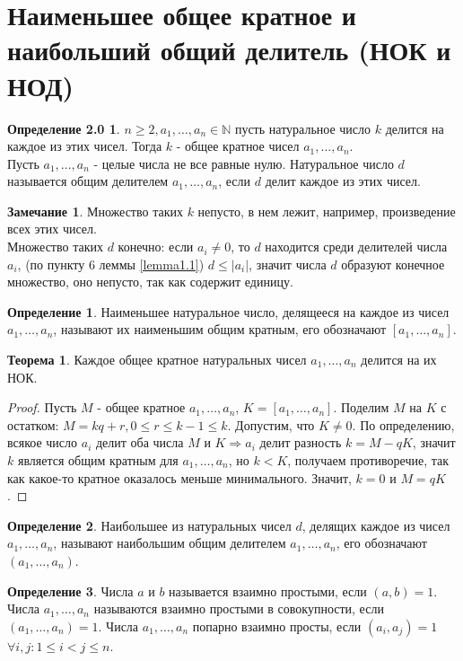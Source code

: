 \documentclass[a4paper, 12pt]{article}
\theoremstyle{definition}
\newtheorem{definition}{Определение}[section]
\newtheorem{theorem}{Теорема}[section]
\newtheorem*{comm}{Замечание}
\newtheorem*{def20}{Определение 2.0}
\begin{document}
    \section{Наименьшее общее кратное и наибольший общий делитель (НОК и НОД)}
    \begin{def20}
         $n\geq 2, a_1, \dots, a_n \in \mathbb{N}$ пусть натуральное число $k$ делится на каждое из этих чисел. Тогда $k$ - общее кратное чисел $a_1, \dots, a_n$. \\
        Пусть $a_1, \dots, a_n$ - целые числа не все равные нулю. Натуральное число $d$ называется общим делителем $a_1, \dots, a_n$, если $d$ делит каждое из этих чисел.
    \end{def20}
    \begin{comm}
        Множество таких $k$ непусто, в нем лежит, например, произведение всех этих чисел. \\ Множество таких $d$ конечно: если $a_i\ne 0$, то $d$ находится среди делителей числа $a_i$, (по пункту 6 леммы \ref{lemma1.1}) $d\leq |a_i|$, значит числа $d$ образуют конечное множество, оно непусто, так как содержит единицу.
    \end{comm}
    \begin{definition}
        Наименьшее натуральное число, делящееся на каждое из чисел $a_1, \dots, a_n$, называют их наименьшим общим кратным, его обозначают $[a_1, \dots, a_n]$.
    \end{definition}
    \begin{theorem} \label{th2.1}
        Каждое общее кратное натуральных чисел $a_1, \dots, a_n$ делится на их НОК.
    \end{theorem}
    \begin{proof}
        Пусть $M$ - общее кратное $a_1, \dots, a_n$, $K=[a_1, \dots, a_n]$. Поделим $M$ на $K$ с остатком: $M=kq+r, 0\leq r\leq k-1\leq k$. Допустим, что $K\ne 0$. По определению, всякое число $a_i$ делит оба числа $M$ и $K \Rightarrow a_i$ делит разность $k=M-qK$, значит $k$ является общим кратным для $a_1, \dots, a_n$, но $k<K$, получаем противоречие, так как какое-то кратное оказалось меньше минимального. Значит, $k=0$ и $M=qK$.  
    \end{proof}
    \begin{definition}
        Наибольшее из натуральных чисел $d$, делящих каждое из чисел $a_1, \dots, a_n$, называют наибольшим общим делителем $a_1, \dots, a_n$, его обозначают $(a_1, \dots, a_n)$.
    \end{definition}
    \begin{definition}
        Числа $a$ и $b$ называется взаимно простыми, если $(a,b)=1$. Числа $a_1, \dots, a_n$ называются взаимно простыми в совокупности, если \\ $(a_1, \dots, a_n)=1$. Числа $a_1, \dots, a_n$ попарно взаимно просты, если $(a_i,a_j)=1$ $\forall i,j: 1\leq i<j\leq n$.
    \end{definition}
\end{document}
